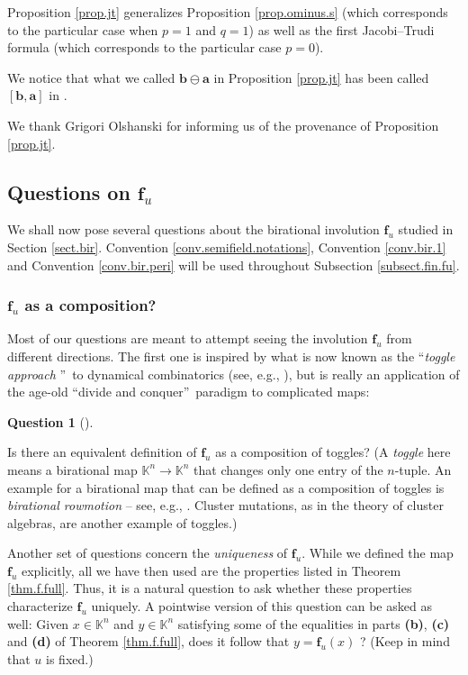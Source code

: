 \documentclass[numbers=enddot,12pt,final,onecolumn,notitlepage]{scrartcl}%
\theoremstyle{definition}
\newtheorem{quest}[theo]{Question}
\newenvironment{question}[1][]
{\begin{quest}[#1]\begin{leftbar}}
{\end{leftbar}\end{quest}}
\newenvironment{question}[1][Question]{\noindent\textbf{#1.} }{\ \rule{0.5em}{0.5em}}
\begin{document}
Proposition \ref{prop.jt} generalizes Proposition \ref{prop.ominus.s} (which
corresponds to the particular case when $p=1$ and $q=1$) as well as the first
Jacobi--Trudi formula \cite[(2.4.16)]{GriRei} (which corresponds to the
particular case $p=0$).

We notice that what we called $\mathbf{b}\ominus\mathbf{a}$ in Proposition
\ref{prop.jt} has been called $\left[  \mathbf{b},\mathbf{a}\right]  $ in
\cite{Stembr87}.

We thank Grigori Olshanski for informing us of the provenance of Proposition
\ref{prop.jt}.

\subsection{\label{subsect.fin.fu}Questions on $\mathbf{f}_{u}$}

We shall now pose several questions about the birational involution
$\mathbf{f}_{u}$ studied in Section \ref{sect.bir}. Convention
\ref{conv.semifield.notations}, Convention \ref{conv.bir.1} and Convention
\ref{conv.bir.peri} will be used throughout Subsection \ref{subsect.fin.fu}.

\subsubsection{$\mathbf{f}_{u}$ as a composition?}

Most of our questions are meant to attempt seeing the involution
$\mathbf{f}_{u}$ from different directions. The first one is inspired by what
is now known as the \textquotedblleft\textit{toggle approach}%
\textquotedblright\ to dynamical combinatorics (see, e.g., \cite{Roby15}), but
is really an application of the age-old \textquotedblleft divide and
conquer\textquotedblright\ paradigm to complicated maps:

\begin{question}
Is there an equivalent definition of $\mathbf{f}_{u}$ as a composition of
toggles? (A \textit{toggle} here means a birational map $\mathbb{K}%
^{n}\rightarrow\mathbb{K}^{n}$ that changes only one entry of the $n$-tuple.
An example for a birational map that can be defined as a composition of
toggles is \textit{birational rowmotion} -- see, e.g., \cite{EinPro13}.
Cluster mutations, as in the theory of cluster algebras, are another example
of toggles.)
\end{question}

Another set of questions concern the \textit{uniqueness} of $\mathbf{f}_{u}$.
While we defined the map $\mathbf{f}_{u}$ explicitly, all we have then used
are the properties listed in Theorem \ref{thm.f.full}. Thus, it is a natural
question to ask whether these properties characterize $\mathbf{f}_{u}$
uniquely. A pointwise version of this question can be asked as well: Given
$x\in\mathbb{K}^{n}$ and $y\in\mathbb{K}^{n}$ satisfying some of the
equalities in parts \textbf{(b)}, \textbf{(c)} and \textbf{(d)} of Theorem
\ref{thm.f.full}, does it follow that $y=\mathbf{f}_{u}\left(  x\right)  $ ?
(Keep in mind that $u$ is fixed.)
\end{document}
